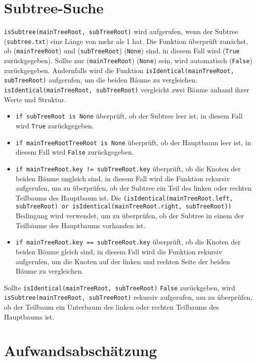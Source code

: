 \documentclass{article}
\begin{document}
\section*{Subtree-Suche}
\texttt{isSubtree(mainTreeRoot, subTreeRoot)} wird aufgerufen, wenn der Subtree (\texttt{subtree.txt}) eine Länge von mehr als 1 hat. Die Funktion überprüft zunächst, ob (\texttt{mainTreeRoot}) und (\texttt{subTreeRoot}) (\texttt{None}) sind, in diesem Fall wird (\texttt{True} zurückgegeben).
Sollte nur (\texttt{mainTreeRoot}) (\texttt{None}) sein, wird automatisch (\texttt{False}) zurückgegeben. Andernfalls wird die Funktion \texttt{isIdentical(mainTreeRoot, subTreeRoot)} aufgerufen, um die beiden Bäume zu vergleichen.
\texttt{isIdentical(mainTreeRoot, subTreeRoot)} vergleicht zwei Bäume anhand ihrer Werte und Struktur.
\begin{itemize}
    \item \texttt{if subTreeRoot is None} überprüft, ob der Subtree leer ist, in diesem Fall wird \texttt{True} zurückgegeben.
    \item \texttt{if mainTreeRootTreeRoot is None} überprüft, ob der Hauptbaum leer ist, in diesem Fall wird \texttt{False} zurückgegeben.
    \item \texttt{if mainTreeRoot.key != subTreeRoot.key} überprüft, ob die Knoten der beiden Bäume ungleich sind, in diesem Fall wird die Funktion rekursiv aufgerufen, um zu überprüfen, ob der Subtree ein Teil des linken oder rechten Teilbaums des Hauptbaum ist.
    Die \texttt{(isIdentical(mainTreeRoot.left, subTreeRoot) or isIdentical(mainTreeRoot.right, subTreeRoot))} Bedingung wird verwendet, um zu überprüfen, ob der Subtree in einem der Teilbäume des Hauptbaums vorhanden ist.
    \item \texttt{if mainTreeRoot.key == subTreeRoot.key} überprüft, ob die Knoten der beiden Bäume gleich sind, in diesem Fall wird die Funktion rekursiv aufgerufen, um die Knoten auf der linken und rechten Seite der beiden Bäume zu vergleichen.
\end{itemize}
Sollte \texttt{isIdentical(mainTreeRoot, subTreeRoot)} \texttt{False} zurückgeben, wird \texttt{isSubtree(mainTreeRoot, subTreeRoot)} rekursiv aufgerufen, um zu überprüfen, ob der Teilbaum ein Unterbaum des linken oder rechten Teilbaums des Hauptbaums ist.

\section*{Aufwandsabschätzung}
\end{document}
